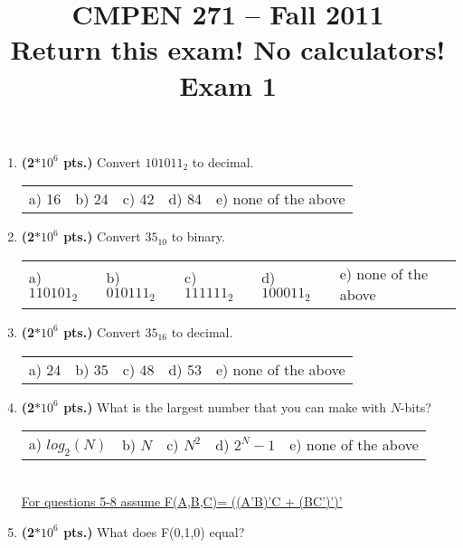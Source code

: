 \documentclass{article}
\begin{document}
\newcommand{\SOPmin}{${\rm SOP}_{\rm min} \ $}
\newcommand{\POSmin}{${\rm POS}_{\rm min} \ $}
\newcommand{\bs}{\backslash}


\title{
\Huge{CMPEN 271 -- Fall 2011}\\
\normalsize{Return this exam!  No calculators!}\\
\normalsize{Exam 1}\\
 }
\date{}

\maketitle{}


\begin{enumerate}
\item {\bf (2$*10^6$ pts.)} Convert $101011_2$ to decimal.

\begin{tabular}{p{0.7in} p{0.7in} p{0.7in} p{0.7in} l}
a) 16 & b) 24 & c) 42 & d) 84 & e) none of the above
\end{tabular}

\item {\bf (2$*10^6$ pts.)} Convert $35_{10}$ to binary.

\begin{tabular}{p{0.7in} p{0.7in} p{0.7in} p{0.7in} l}
a) $110101_2$ & b) $010111_2$ & c) $111111_2$ & d) $100011_2$ & e) none of the above
\end{tabular}

\item {\bf (2$*10^6$ pts.)} Convert $35_{16}$ to decimal.

\begin{tabular}{p{0.7in} p{0.7in} p{0.7in} p{0.7in} l}
a) 24 & b) 35 & c) 48 & d) 53 & e) none of the above
\end{tabular}

\item {\bf (2$*10^6$ pts.)} What is the largest number that you can make with $N$-bits?

\begin{tabular}{p{0.7in} p{0.7in} p{0.7in} p{0.7in} l}
a) $log_2(N)$ & b) $N$ & c) $N^2$ & d) $2^N-1$ & e) none of the above
\end{tabular} \\

\underline{For questions 5-8 assume F(A,B,C)= ((A'B)'C + (BC')')' }

\item {\bf (2$*10^6$ pts.)} What does F(0,1,0) equal?


\end{enumerate}
\end{document}
